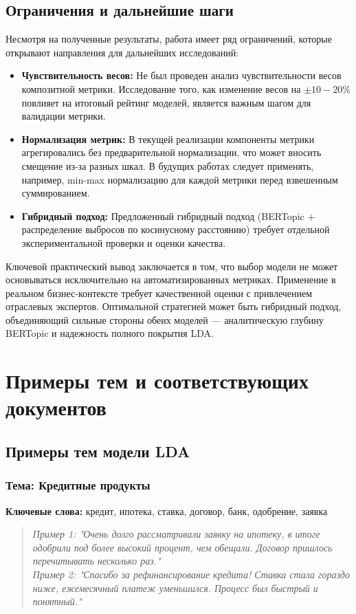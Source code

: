 \documentclass{article}
\begin{document}
\subsection{Ограничения и дальнейшие шаги}
Несмотря на полученные результаты, работа имеет ряд ограничений, которые открывают направления для дальнейших исследований:
\begin{itemize}
    \item \textbf{Чувствительность весов:} Не был проведен анализ чувствительности весов композитной метрики. Исследование того, как изменение весов на $\pm10-20\%$ повлияет на итоговый рейтинг моделей, является важным шагом для валидации метрики.
    \item \textbf{Нормализация метрик:} В текущей реализации компоненты метрики агрегировались без предварительной нормализации, что может вносить смещение из-за разных шкал. В будущих работах следует применять, например, min-max нормализацию для каждой метрики перед взвешенным суммированием.
    \item \textbf{Гибридный подход:} Предложенный гибридный подход (BERTopic + распределение выбросов по косинусному расстоянию) требует отдельной экспериментальной проверки и оценки качества.
\end{itemize}

Ключевой практический вывод заключается в том, что выбор модели не может основываться исключительно на автоматизированных метриках. Применение в реальном бизнес-контексте требует качественной оценки с привлечением отраслевых экспертов. Оптимальной стратегией может быть гибридный подход, объединяющий сильные стороны обеих моделей — аналитическую глубину BERTopic и надежность полного покрытия LDA.

\appendix
\section{Примеры тем и соответствующих документов}

\subsection{Примеры тем модели LDA}

\subsubsection{Тема: Кредитные продукты}
\textbf{Ключевые слова:} кредит, ипотека, ставка, договор, банк, одобрение, заявка
\begin{quote}
\small
\textit{Пример 1: "Очень долго рассматривали заявку на ипотеку, в итоге одобрили под более высокий процент, чем обещали. Договор пришлось перечитывать несколько раз."} \\
\textit{Пример 2: "Спасибо за рефинансирование кредита! Ставка стала гораздо ниже, ежемесячный платеж уменьшился. Процесс был быстрый и понятный."}
\end{quote}
\end{document}
